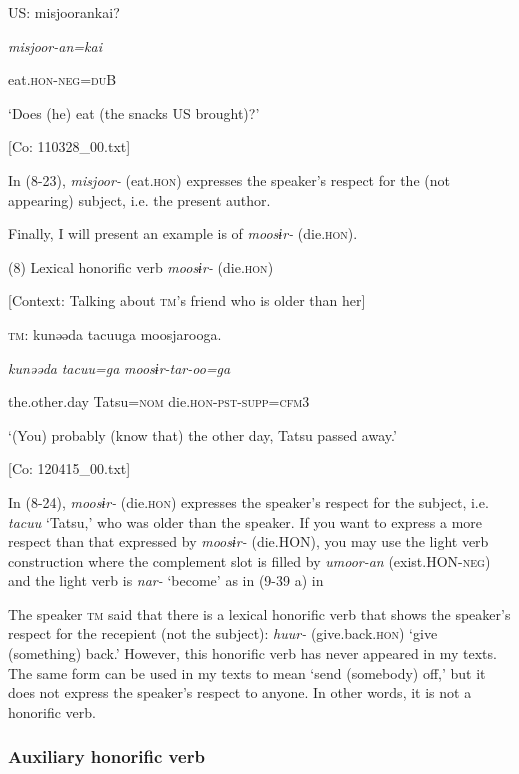   US:  misjoorankai?

    \textit{misjoor{}-an=kai}

    eat.\textsc{hon}-\textsc{neg}=\textsc{du}B

    ‘Does (he) eat (the snacks US brought)?’

    [Co: 110328\_00.txt]

In (8-23), \textit{misjoor-} (eat.\textsc{hon}) expresses the speaker’s respect for the (not appearing) subject, i.e. the present author.

  Finally, I will present an example is of \textit{moosɨr-} (die.\textsc{hon}).

(8)  Lexical honorific verb \textit{moosɨr-} (die.\textsc{hon})

  [Context: Talking about \textsc{tm}’s friend who is older than her]

  \textsc{tm}:  kunəəda  tacuuga  moosjarooga.

    \textit{kunəəda}  \textit{tacuu=ga}  \textit{moosɨr{}-tar-oo=ga}

    the.other.day  Tatsu=\textsc{nom}  die.\textsc{hon}-\textsc{pst}-\textsc{supp}=\textsc{cfm}3

    ‘(You) probably (know that) the other day, Tatsu passed away.’

    [Co: 120415\_00.txt]

In (8-24), \textit{moosɨr-} (die.\textsc{hon}) expresses the speaker’s respect for the subject, i.e. \textit{tacuu} ‘Tatsu,’ who was older than the speaker. If you want to express a more respect than that expressed by \textit{moosɨr-} (die.HON), you may use the light verb construction where the complement slot is filled by \textit{umoor-an} (exist.HON-\textsc{neg}) and the light verb is \textit{nar-} ‘become’ as in (9-39 a) in 

  The speaker \textsc{tm} said that there is a lexical honorific verb that shows the speaker’s respect for the recepient (not the subject): \textit{huur-} (give.back.\textsc{hon}) ‘give (something) back.’ However, this honorific verb has never appeared in my texts. The same form can be used in my texts to mean ‘send (somebody) off,’ but it does not express the speaker’s respect to anyone. In other words, it is not a honorific verb.

\subsubsection{Auxiliary honorific verb}

